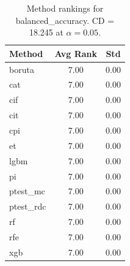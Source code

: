 \begin{table}[h]
\centering
\caption{Method rankings for balanced_accuracy. CD = 18.245 at $\alpha=0.05$.}
\label{tab:ranks_balanced_accuracy}
\begin{tabular}{lcc}
\toprule
Method & Avg Rank & Std \\
\midrule
boruta & 7.00 & 0.00 \\
cat & 7.00 & 0.00 \\
cif & 7.00 & 0.00 \\
cit & 7.00 & 0.00 \\
cpi & 7.00 & 0.00 \\
et & 7.00 & 0.00 \\
lgbm & 7.00 & 0.00 \\
pi & 7.00 & 0.00 \\
ptest_mc & 7.00 & 0.00 \\
ptest_rdc & 7.00 & 0.00 \\
rf & 7.00 & 0.00 \\
rfe & 7.00 & 0.00 \\
xgb & 7.00 & 0.00 \\
\bottomrule
\end{tabular}
\end{table}